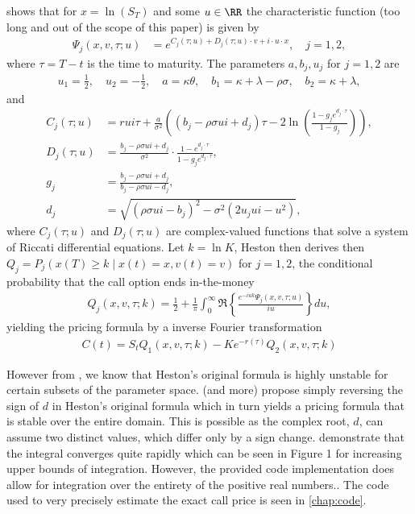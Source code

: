 \documentclass[11pt]{article}
\numberwithin{equation}{section}
\newcommand{\lc}{\left\{}
\newcommand{\rc}{\right\}}
\begin{document}
\cite{heston1993closed} shows that for $x=\ln(S_T)$ and some $u\in\RR$ the characteristic function (too long
and out of the scope of this paper) is given by
\begin{align*}
\Psi_j(x, v, \tau; u) &= e^{C_j(\tau; u) + D_j(\tau; u) \cdot v + i \cdot u \cdot x}, \quad j = 1, 2,
\end{align*}
where $\tau = T - t$ is the time to maturity. The parameters $a, b_j, u_j$ for $j = 1, 2$ are
\begin{align*}
u_1 = \frac{1}{2}, \quad u_2 = -\frac{1}{2}, \quad
a = \kappa \theta, \quad b_1 = \kappa + \lambda - \rho \sigma, \quad b_2 = \kappa + \lambda,
\end{align*}
and 
\begin{align*}
C_j(\tau; u) &= rui\tau + \frac{a}{\sigma^2} \left( (b_j - \rho \sigma ui + d_j)\tau - 2 \ln \left( \frac{1 - g_j e^{d_j \cdot \tau}}{1 - g_j} \right) \right), \\
D_j(\tau; u) &= \frac{b_j - \rho \sigma ui + d_j}{\sigma^2} \cdot \frac{1 - e^{d_j \cdot \tau}}{1 - g_j e^{d_j \cdot \tau}}, \\
g_j &= \frac{b_j - \rho \sigma ui + d_j}{b_j - \rho \sigma ui - d_j}, \\
d_j &= \sqrt{(\rho \sigma ui - b_j)^2 - \sigma^2 (2u_j ui - u^2)},
\end{align*}
where $C_j(\tau;u)$ and $D_j(\tau;u)$ are complex-valued functions that solve a
system of Riccati differential equations. Let $k=\ln K$, Heston then derives
then $Q_j=P_j(x(T)\geq k \mid x(t)=x, v(t)=v)$ for $j=1,2$, the conditional probability that the call option ends in-the-money
\begin{align*}
    Q_j(x,v,\tau;k)=\frac{1}{2}+\frac{1}{\pi}\int_0^\infty \Re{\lc \frac{e^{-iuk}\Psi_j(x,v,\tau;u)}{iu} \rc} du,
\end{align*}
yielding the pricing formula by a inverse Fourier transformation
\begin{align}
    C(t)=S_tQ_1(x,v,\tau;k)-Ke^{-r(\tau)}Q_2(x,v,\tau;k)
\end{align}

However from
\cite{Albrecher2006LittleHeston}, we know that Heston's original formula is
highly unstable for certain subsets of the parameter space.
\cite{Albrecher2006LittleHeston} (and more) propose simply reversing the sign of $d$ in
Heston's original formula which in turn yields a pricing formula that is stable
over the entire domain. This is possible as the complex root, $d$, can assume
two distinct values, which differ only by a sign change. \cite{kendall1977advanced} demonstrate
that the integral converges quite rapidly which can be seen in Figure 1 for
increasing upper bounds of integration. However, the provided code implementation does
allow for integration over the entirety of the positive real numbers.. The code used to very
precisely estimate the exact call price is seen in \autoref{chap:code}.
\end{document}
